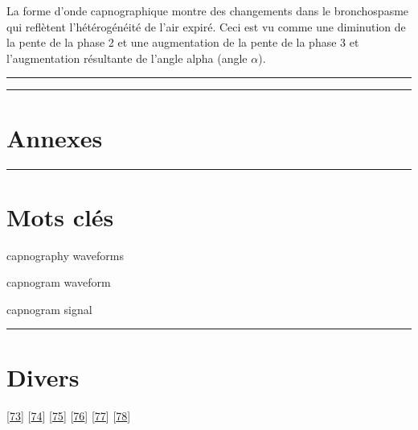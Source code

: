 \documentclass[12pt,]{article}
\begin{document}
La forme d'onde capnographique montre des changements dans le
bronchospasme qui reflètent l'hétérogénéité de l'air expiré. Ceci est vu
comme une diminution de la pente de la phase 2 et une augmentation de la
pente de la phase 3 et l'augmentation résultante de l'angle alpha (angle
\(\alpha\)).

\pagebreak

\begin{center}\rule{0.5\linewidth}{\linethickness}\end{center}

\pagebreak

\begin{center}\rule{0.5\linewidth}{\linethickness}\end{center}

\hypertarget{annexes}{%
\section{Annexes}\label{annexes}}

\pagebreak

\begin{center}\rule{0.5\linewidth}{\linethickness}\end{center}

\hypertarget{mots-cles}{%
\section{Mots clés}\label{mots-cles}}

capnography waveforms

capnogram waveform

capnogram signal

\pagebreak

\begin{center}\rule{0.5\linewidth}{\linethickness}\end{center}

\hypertarget{divers-1}{%
\section{Divers}\label{divers-1}}

{[}\protect\hyperlink{ref-delmas2011readmissions}{73}{]}
{[}\protect\hyperlink{ref-delmas2010asthma}{74}{]}
{[}\protect\hyperlink{ref-delmas2017augmentation}{75}{]}
{[}\protect\hyperlink{ref-tattersfield2001asthma}{76}{]}
{[}\protect\hyperlink{ref-hart2002asthma}{77}{]}
{[}\protect\hyperlink{ref-salmeron2001asthma}{78}{]}
\end{document}
